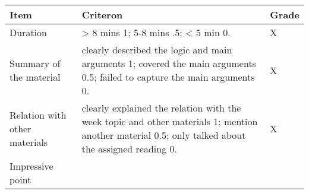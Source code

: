 \documentclass[11pt,]{article}
\theoremstyle{definition}
\theoremstyle{definition}
\theoremstyle{remark}
\begin{document}
\begin{longtable}[]{@{}lll@{}}
\toprule
\begin{minipage}[b]{0.16\columnwidth}\raggedright\strut
Item\strut
\end{minipage} & \begin{minipage}[b]{0.72\columnwidth}\raggedright\strut
Criteron\strut
\end{minipage} & \begin{minipage}[b]{0.04\columnwidth}\raggedright\strut
Grade\strut
\end{minipage}\tabularnewline
\midrule
\endhead
\begin{minipage}[t]{0.16\columnwidth}\raggedright\strut
Duration\strut
\end{minipage} & \begin{minipage}[t]{0.72\columnwidth}\raggedright\strut
\textgreater{} 8 mins 1; 5-8 mins .5; \textless{} 5 min 0.\strut
\end{minipage} & \begin{minipage}[t]{0.04\columnwidth}\raggedright\strut
X\strut
\end{minipage}\tabularnewline
\begin{minipage}[t]{0.16\columnwidth}\raggedright\strut
Summary of the material\strut
\end{minipage} & \begin{minipage}[t]{0.72\columnwidth}\raggedright\strut
clearly described the logic and main arguments 1; covered the main
arguments 0.5; failed to capture the main arguments 0.\strut
\end{minipage} & \begin{minipage}[t]{0.04\columnwidth}\raggedright\strut
X\strut
\end{minipage}\tabularnewline
\begin{minipage}[t]{0.16\columnwidth}\raggedright\strut
Relation with other materials\strut
\end{minipage} & \begin{minipage}[t]{0.72\columnwidth}\raggedright\strut
clearly explained the relation with the week topic and other materials
1; mention another material 0.5; only talked about the assigned reading
0.\strut
\end{minipage} & \begin{minipage}[t]{0.04\columnwidth}\raggedright\strut
X\strut
\end{minipage}\tabularnewline
\begin{minipage}[t]{0.16\columnwidth}\raggedright\strut
Impressive point\strut
\end{minipage} & \begin{minipage}[t]{0.72\columnwidth}\raggedright\strut

\end{minipage}
\end{longtable}
\end{document}
